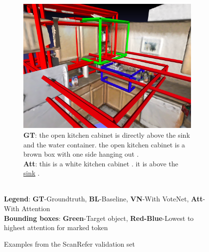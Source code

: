 \documentclass[10pt,twocolumn,letterpaper]{article}
\begin{document}
\begin{figure}
\begin{subfigure}[c]{.45\textwidth}
		\includegraphics[width=\textwidth]{figures/gt_scene0164_00_2_0_att_06.png}
		\caption{
			\textbf{GT}: the open kitchen cabinet is directly above the sink and the water container. the open kitchen cabinet is a brown box with one side hanging out .\\
			\textbf{Att}: this is a white kitchen cabinet . it is above the \underline{sink} .\\}
		\label{fig:example_2}
	\end{subfigure}
	\vspace{.5\baselineskip}\\
	{\footnotesize
		\textbf{Legend}: \textbf{GT}-Groundtruth, \textbf{BL}-Baseline, \textbf{VN}-With VoteNet, \textbf{Att}-With Attention\\
		\textbf{Bounding boxes}: \textbf{\color{green} Green}-Target object, \textbf{{\color{red}Red}-{\color{blue}Blue}}-Lowest to highest attention for marked token
	}
	\caption{Examples from the ScanRefer validation set}
	\label{fig:examples}
	
\end{figure}


{\small


}
\end{document}
